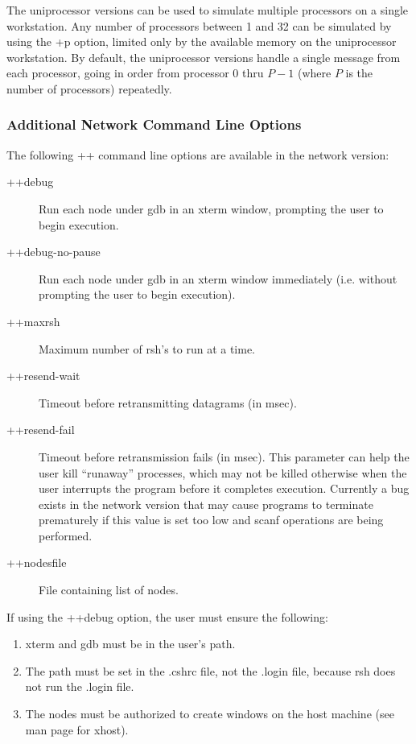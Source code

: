 The uniprocessor versions can be used to simulate multiple
processors on a single workstation.  Any number of processors between 1 and 32 can be simulated by
using the {\fexec +p} option, limited only by the available memory on the
uniprocessor workstation.  By default, the uniprocessor versions handle
a single message from each processor, going in order from processor 0
thru $P-1$ (where $P$ is the number of processors) repeatedly.  

\subsubsection[Additional Network Command Line Options]
{Additional Network Command Line Options}
\label{network command line options}

The following {\fexec ++} command line options are available in
the network version:
\begin{description}
\item[{\fexec ++debug}] Run each node under gdb in an xterm window, prompting
the user to begin execution.
\item[{\fexec ++debug-no-pause}] Run each node under gdb in an xterm window
immediately (i.e. without prompting the user to begin execution).
\item[{\fexec ++maxrsh}] Maximum number of {\fcmd rsh}'s to run at a
time.
\item[{\fexec ++resend-wait}] Timeout before retransmitting datagrams
(in msec).
\item[{\fexec ++resend-fail}] Timeout before retransmission fails (in
msec).
This parameter can help the user kill ``runaway'' processes, which may not
be killed otherwise when the user interrupts the program before it 
completes execution.
Currently a bug exists in the network version that may cause programs to
terminate prematurely if this value is set too low and {\fexec scanf} 
operations are being performed.

\item[{\fexec ++nodesfile}] File containing list of nodes.
\end{description}

If using the {\fexec ++debug} option, the user must ensure the
following:
\begin{enumerate}
\item {\fexec xterm} and {\fexec gdb} must be in the user's path.
\item The path must be set in the {\fexec .cshrc} file, not the {\fexec .login}
file, because {\fexec rsh} does not run the {\fexec .login} file. 
\item The nodes must be authorized to create windows on the host machine (see
man page for {\fexec xhost}).
\end{enumerate}
